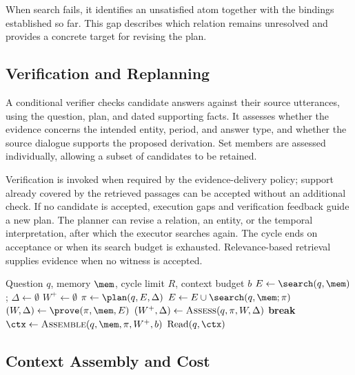 When search fails, it identifies an unsatisfied atom together with the
bindings established so far. This gap describes which relation remains
unresolved and provides a concrete target for revising the plan.

\subsection{Verification and Replanning}
\label{sec:method-verify}

A conditional verifier checks candidate answers against their source
utterances, using the question, plan, and dated supporting facts.
It assesses whether the evidence concerns the intended entity, period,
and answer type, and whether the source dialogue supports the proposed
derivation. Set members are assessed individually, allowing a subset
of candidates to be retained.

Verification is invoked when required by the evidence-delivery policy;
support already covered by the retrieved passages can be accepted
without an additional check. If no candidate is accepted, execution
gaps and verification feedback guide a new plan. The planner can revise
a relation, an entity, or the temporal interpretation, after which the
executor searches again. The cycle ends on acceptance or when its
search budget is exhausted. Relevance-based retrieval supplies evidence
when no witness is accepted.

\begin{algorithm}[t]
\caption{Witness-guided memory retrieval}
\label{alg:search}
\small
\begin{algorithmic}[1]
\Require Question $q$, memory $\mem$, cycle limit $R$, context budget $b$
\State $E\gets\search(q,\mem)$; $\Delta\gets\emptyset$
\State $W^+\gets\emptyset$
  \State $\pi\gets\plan(q,E,\Delta)$
  \State $E\gets E\cup\search(q,\mem;\pi)$
  \State $(W,\Delta)\gets\prove(\pi,\mem,E)$
  \State $(W^+,\Delta)\gets\textsc{Assess}(q,\pi,W,\Delta)$
   \State \textbf{break} \EndIf
\EndFor
\State $\ctx\gets\textsc{Assemble}(q,\mem,\pi,W^+,b)$
\State \Return $\mathrm{Read}(q,\ctx)$
\end{algorithmic}
\end{algorithm}

\subsection{Context Assembly and Cost}
\label{sec:method-respond}
\label{sec:method-guarantees}

